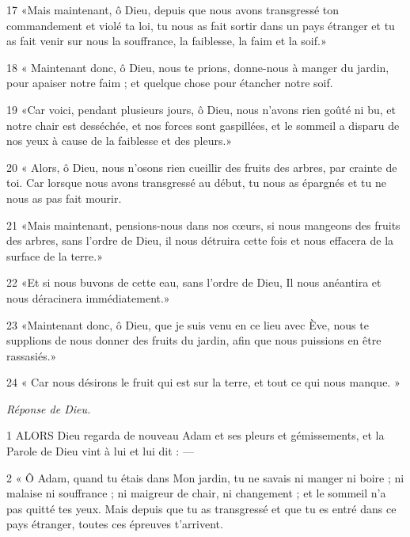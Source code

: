 \par 17 «Mais maintenant, ô Dieu, depuis que nous avons transgressé ton commandement et violé ta loi, tu nous as fait sortir dans un pays étranger et tu as fait venir sur nous la souffrance, la faiblesse, la faim et la soif.»

\par 18 « Maintenant donc, ô Dieu, nous te prions, donne-nous à manger du jardin, pour apaiser notre faim ; et quelque chose pour étancher notre soif.

\par 19 «Car voici, pendant plusieurs jours, ô Dieu, nous n'avons rien goûté ni bu, et notre chair est desséchée, et nos forces sont gaspillées, et le sommeil a disparu de nos yeux à cause de la faiblesse et des pleurs.»

\par 20 « Alors, ô Dieu, nous n'osons rien cueillir des fruits des arbres, par crainte de toi. Car lorsque nous avons transgressé au début, tu nous as épargnés et tu ne nous as pas fait mourir.

\par 21 «Mais maintenant, pensions-nous dans nos cœurs, si nous mangeons des fruits des arbres, sans l'ordre de Dieu, il nous détruira cette fois et nous effacera de la surface de la terre.»

\par 22 «Et si nous buvons de cette eau, sans l'ordre de Dieu, Il nous anéantira et nous déracinera immédiatement.»

\par 23 «Maintenant donc, ô Dieu, que je suis venu en ce lieu avec Ève, nous te supplions de nous donner des fruits du jardin, afin que nous puissions en être rassasiés.»

\par 24 « Car nous désirons le fruit qui est sur la terre, et tout ce qui nous manque. »


\par \textit{Réponse de Dieu.}

\par 1 ALORS Dieu regarda de nouveau Adam et ses pleurs et gémissements, et la Parole de Dieu vint à lui et lui dit : —

\par 2 « Ô Adam, quand tu étais dans Mon jardin, tu ne savais ni manger ni boire ; ni malaise ni souffrance ; ni maigreur de chair, ni changement ; et le sommeil n'a pas quitté tes yeux. Mais depuis que tu as transgressé et que tu es entré dans ce pays étranger, toutes ces épreuves t’arrivent.

